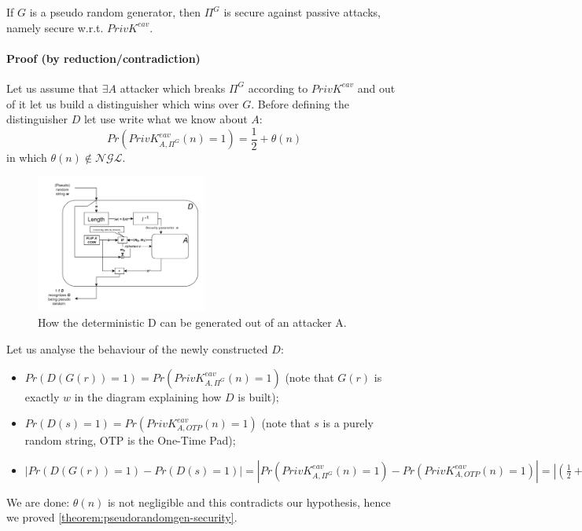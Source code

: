 \documentclass[../main]{subfiles}
\begin{document}
\begin{theorem}
    \label{theorem:pseudorandomgen-security}
    If $G$ is a pseudo random generator, then $\Pi^G$ is secure against passive attacks, namely secure w.r.t. $PrivK^{eav}$.
\end{theorem}

\paragraph{Proof (by reduction/contradiction)}
Let us assume that $\exists A$ attacker which breaks $\Pi^G$ according to $PrivK^{eav}$ and out of it let us build a distinguisher which wins over $G$.
Before defining the distinguisher $D$ let use write what we know about $A$:
$$Pr(PrivK^{eav}_{A,\Pi^G}(n) = 1) = \frac{1}{2} + \theta(n)$$
in which $\theta(n) \notin{} \mathcal{NGL}$.

\newpage
\begin{figure}[h]
    \centering
    \includegraphics[width=0.5\textwidth]{images/security_of_pseudorandomgen}
    \caption{How the deterministic D can be generated out of an attacker A.}
\end{figure}
\noindent
Let us analyse the behaviour of the newly constructed $D$:
\begin{itemize}
    \item $Pr(D(G(r)) = 1) = Pr(PrivK^{eav}_{A,\Pi^G}(n) = 1)$ (note that $G(r)$ is exactly $w$ in the diagram explaining how $D$ is built);
    \item $Pr(D(s) = 1) = Pr(PrivK^{eav}_{A,OTP}(n) = 1)$ (note that $s$ is a purely random string, OTP is the One-Time Pad);
    \item $|Pr(D(G(r)) = 1) - Pr(D(s) = 1)| = |Pr(PrivK^{eav}_{A,\Pi^G}(n) = 1) - Pr(PrivK^{eav}_{A,OTP}(n) = 1)| = |(\frac{1}{2} + \theta(n)) - \frac{1}{2}| = |\theta(n)| = \theta(n)$
\end{itemize}
We are done: $\theta(n)$ is not negligible and this contradicts our hypothesis, hence we proved \ref{theorem:pseudorandomgen-security}.
\end{document}
